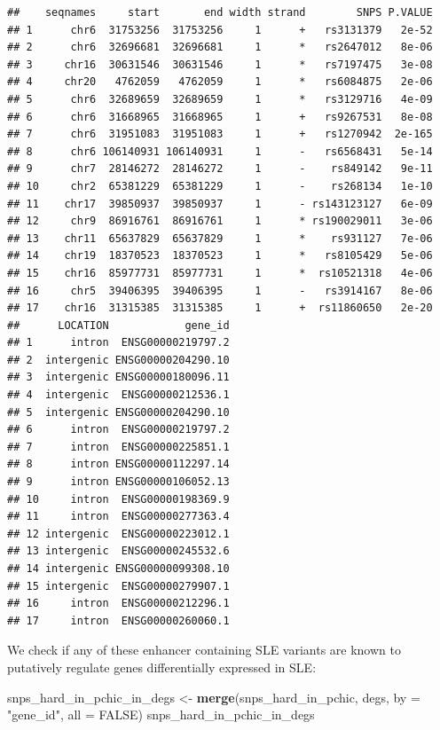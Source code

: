 \documentclass[9pt,a4paper,]{extarticle}
\newenvironment{Shaded}{\begin{snugshade}}{\end{snugshade}}
\newcommand{\KeywordTok}[1]{\textcolor[rgb]{0.13,0.29,0.53}{\textbf{#1}}}
\newcommand{\DataTypeTok}[1]{\textcolor[rgb]{0.13,0.29,0.53}{#1}}
\newcommand{\StringTok}[1]{\textcolor[rgb]{0.31,0.60,0.02}{#1}}
\newcommand{\OtherTok}[1]{\textcolor[rgb]{0.56,0.35,0.01}{#1}}
\newcommand{\NormalTok}[1]{#1}
\begin{document}
\begin{verbatim}
##    seqnames     start       end width strand        SNPS P.VALUE
## 1      chr6  31753256  31753256     1      +   rs3131379   2e-52
## 2      chr6  32696681  32696681     1      *   rs2647012   8e-06
## 3     chr16  30631546  30631546     1      *   rs7197475   3e-08
## 4     chr20   4762059   4762059     1      *   rs6084875   2e-06
## 5      chr6  32689659  32689659     1      *   rs3129716   4e-09
## 6      chr6  31668965  31668965     1      +   rs9267531   8e-08
## 7      chr6  31951083  31951083     1      +   rs1270942  2e-165
## 8      chr6 106140931 106140931     1      -   rs6568431   5e-14
## 9      chr7  28146272  28146272     1      -    rs849142   9e-11
## 10     chr2  65381229  65381229     1      -    rs268134   1e-10
## 11    chr17  39850937  39850937     1      - rs143123127   6e-09
## 12     chr9  86916761  86916761     1      * rs190029011   3e-06
## 13    chr11  65637829  65637829     1      *    rs931127   7e-06
## 14    chr19  18370523  18370523     1      *   rs8105429   5e-06
## 15    chr16  85977731  85977731     1      *  rs10521318   4e-06
## 16     chr5  39406395  39406395     1      -   rs3914167   8e-06
## 17    chr16  31315385  31315385     1      +  rs11860650   2e-20
##      LOCATION            gene_id
## 1      intron  ENSG00000219797.2
## 2  intergenic ENSG00000204290.10
## 3  intergenic ENSG00000180096.11
## 4  intergenic  ENSG00000212536.1
## 5  intergenic ENSG00000204290.10
## 6      intron  ENSG00000219797.2
## 7      intron  ENSG00000225851.1
## 8      intron ENSG00000112297.14
## 9      intron ENSG00000106052.13
## 10     intron  ENSG00000198369.9
## 11     intron  ENSG00000277363.4
## 12 intergenic  ENSG00000223012.1
## 13 intergenic  ENSG00000245532.6
## 14 intergenic ENSG00000099308.10
## 15 intergenic  ENSG00000279907.1
## 16     intron  ENSG00000212296.1
## 17     intron  ENSG00000260060.1
\end{verbatim}

We check if any of these enhancer containing SLE variants are known to putatively regulate genes differentially expressed in SLE:

\begin{Shaded}
\begin{Highlighting}[]
\NormalTok{snps_hard_in_pchic_in_degs <-}\StringTok{ }\KeywordTok{merge}\NormalTok{(snps_hard_in_pchic, degs, }\DataTypeTok{by =} \StringTok{"gene_id"}\NormalTok{, }\DataTypeTok{all =} \OtherTok{FALSE}\NormalTok{)}
\NormalTok{snps_hard_in_pchic_in_degs}
\end{Highlighting}
\end{Shaded}
\end{document}
